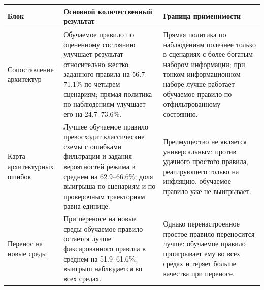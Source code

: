 \begin{tabular}{p{}p{}p{}}
\toprule
Блок & Основной количественный результат & Граница применимости \\
\midrule
Сопоставление архитектур & Обучаемое правило по оцененному состоянию улучшает результат относительно жестко заданного правила на 56.7--71.1\% по четырем сценариям; прямая политика по наблюдениям улучшает его на 24.7--73.6\%. & Прямая политика по наблюдениям полезнее только в сценариях с более богатым набором информации; при тонком информационном наборе лучше работает обучаемое правило по отфильтрованному состоянию. \\
Карта архитектурных ошибок & Лучшее обучаемое правило превосходит классические схемы с ошибками фильтрации и задания вероятностей режима в среднем на 62.9--66.6\%; доля выигрыша по сценариям и по проверочным траекториям равна единице. & Преимущество не является универсальным: против удачного простого правила, реагирующего только на инфляцию, обучаемое правило уже не выигрывает. \\
Перенос на новые среды & При переносе на новые среды обучаемое правило остается лучше фиксированного правила в среднем на 51.9--61.6\%; выигрыш наблюдается во всех средах. & Однако перенастроенное простое правило переносится лучше: обучаемое правило проигрывает ему во всех средах и теряет больше качества при переносе. \\
\bottomrule
\end{tabular}